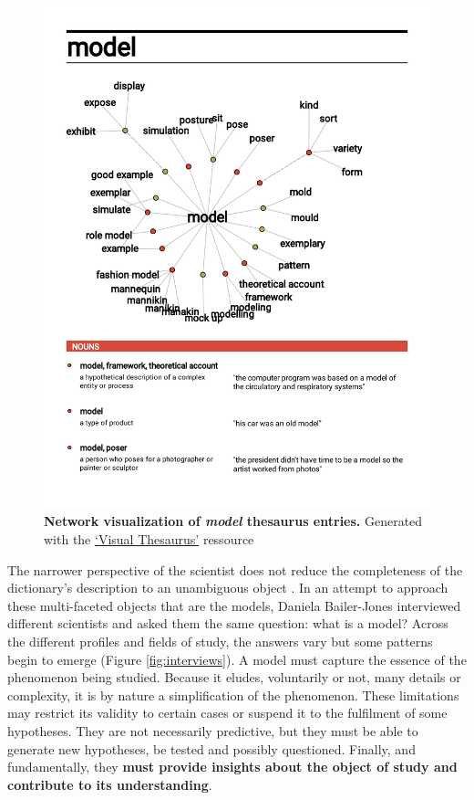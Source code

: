 \documentclass[a4paper,12pt,twoside,onecolumn,openright,final,oldfontcommands]{memoir}
\begin{document}
\begin{figure}

{\centering \includegraphics[width=0.9\linewidth]{fig/visualThesaurus} 

}

\caption[Network visualization of *model* thesaurus entries]{\textbf{Network visualization of
\emph{model} thesaurus entries.} Generated with the
\href{https://www.visualthesaurus.com}{`Visual Thesaurus'} ressource}\label{fig:visual-thesaurus}
\end{figure}





The narrower perspective of the scientist does not reduce the
completeness of the dictionary's description to an unambiguous object
\citep{bailer2002scientists}. In an attempt to approach these
multi-faceted objects that are the models, Daniela Bailer-Jones
interviewed different scientists and asked them the same question: what
is a model? Across the different profiles and fields of study, the
answers vary but some patterns begin to emerge (Figure
\ref{fig:interviews}). A model must capture the essence of the
phenomenon being studied. Because it eludes, voluntarily or not, many
details or complexity, it is by nature a simplification of the
phenomenon. These limitations may restrict its validity to certain cases
or suspend it to the fulfilment of some hypotheses. They are not
necessarily predictive, but they must be able to generate new
hypotheses, be tested and possibly questioned. Finally, and
fundamentally, they \textbf{must provide insights about the object of
study and contribute to its understanding}.
\end{document}

